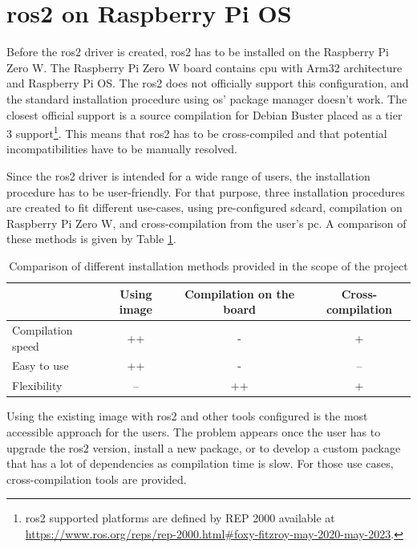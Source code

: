 \section{\ac{ros2} on Raspberry Pi OS}
Before the \ac{ros2} driver is created, \ac{ros2} has to be installed on the Raspberry Pi Zero W.
The Raspberry Pi Zero W board contains \ac{cpu} with Arm32 architecture and Raspberry Pi OS.
The \ac{ros2} does not officially support this configuration, and the standard installation procedure using \acs{os}' package manager doesn't work.
The closest official support is a source compilation for Debian Buster placed as a tier 3 support\footnote{\ac{ros2} supported platforms are defined by REP 2000 available at \url{https://www.ros.org/reps/rep-2000.html\#foxy-fitzroy-may-2020-may-2023}.}.
This means that \ac{ros2} has to be cross-compiled and that potential incompatibilities have to be manually resolved.

Since the \ac{ros2} driver is intended for a wide range of users, the installation procedure has to be user-friendly.
For that purpose, three installation procedures are created to fit different use-cases, using pre-configured \ac{sdcard}, compilation on Raspberry Pi Zero W, and cross-compilation from the user's \ac{pc}.
A comparison of these methods is given by Table \ref{tab:physical:installation}.

\begin{table}[H]
    \begin{adjustwidth}{-1.5in}{-1.5in}
    \centering
    \begin{tabular}{|l|c|c|c|}
        \hline
        & \textbf{Using image} & \textbf{Compilation on the board} & \textbf{Cross-compilation} \\
        \hline
        Compilation speed & ++ & - & + \\
        \hline
        Easy to use & ++ & - & -- \\
        \hline
        Flexibility & -- & ++ & + \\
        \hline
    \end{tabular}
    \caption{Comparison of different installation methods provided in the scope of the project}
    \label{tab:physical:installation}
    \end{adjustwidth}
\end{table}

Using the existing image with \ac{ros2} and other tools configured is the most accessible approach for the users.
The problem appears once the user has to upgrade the \ac{ros2} version, install a new package, or to develop a custom package that has a lot of dependencies as compilation time is slow.
For those use cases, cross-compilation tools are provided.

